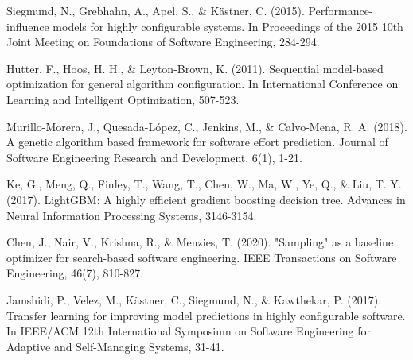 \documentclass[10pt]{article}
\begin{document}
\begin{thebibliography}{9}

Siegmund, N., Grebhahn, A., Apel, S., \& Kästner, C. (2015). Performance-influence models for highly configurable systems. In Proceedings of the 2015 10th Joint Meeting on Foundations of Software Engineering, 284-294.

Hutter, F., Hoos, H. H., \& Leyton-Brown, K. (2011). Sequential model-based optimization for general algorithm configuration. In International Conference on Learning and Intelligent Optimization, 507-523.

Murillo-Morera, J., Quesada-López, C., Jenkins, M., \& Calvo-Mena, R. A. (2018). A genetic algorithm based framework for software effort prediction. Journal of Software Engineering Research and Development, 6(1), 1-21.

Ke, G., Meng, Q., Finley, T., Wang, T., Chen, W., Ma, W., Ye, Q., \& Liu, T. Y. (2017). LightGBM: A highly efficient gradient boosting decision tree. Advances in Neural Information Processing Systems, 3146-3154.

Chen, J., Nair, V., Krishna, R., \& Menzies, T. (2020). "Sampling" as a baseline optimizer for search-based software engineering. IEEE Transactions on Software Engineering, 46(7), 810-827.

Jamshidi, P., Velez, M., Kästner, C., Siegmund, N., \& Kawthekar, P. (2017). Transfer learning for improving model predictions in highly configurable software. In IEEE/ACM 12th International Symposium on Software Engineering for Adaptive and Self-Managing Systems, 31-41.

\end{thebibliography}
\end{document}
